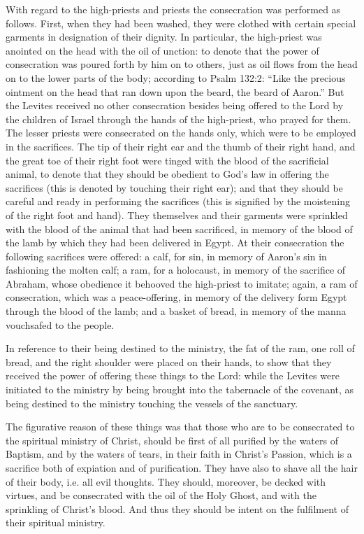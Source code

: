 With regard to the high-priests and priests the consecration was performed as follows. First, when they had been washed, they were clothed with certain special garments in designation of their dignity. In particular, the high-priest was anointed on the head with the oil of unction: to denote that the power of consecration was poured forth by him on to others, just as oil flows from the head on to the lower parts of the body; according to Psalm 132:2: ``Like the precious ointment on the head that ran down upon the beard, the beard of Aaron.'' But the Levites received no other consecration besides being offered to the Lord by the children of Israel through the hands of the high-priest, who prayed for them. The lesser priests were consecrated on the hands only, which were to be employed in the sacrifices. The tip of their right ear and the thumb of their right hand, and the great toe of their right foot were tinged with the blood of the sacrificial animal, to denote that they should be obedient to God's law in offering the sacrifices (this is denoted by touching their right ear); and that they should be careful and ready in performing the sacrifices (this is signified by the moistening of the right foot and hand). They themselves and their garments were sprinkled with the blood of the animal that had been sacrificed, in memory of the blood of the lamb by which they had been delivered in Egypt. At their consecration the following sacrifices were offered: a calf, for sin, in memory of Aaron's sin in fashioning the molten calf; a ram, for a holocaust, in memory of the sacrifice of Abraham, whose obedience it behooved the high-priest to imitate; again, a ram of consecration, which was a peace-offering, in memory of the delivery form Egypt through the blood of the lamb; and a basket of bread, in memory of the manna vouchsafed to the people.

In reference to their being destined to the ministry, the fat of the ram, one roll of bread, and the right shoulder were placed on their hands, to show that they received the power of offering these things to the Lord: while the Levites were initiated to the ministry by being brought into the tabernacle of the covenant, as being destined to the ministry touching the vessels of the sanctuary.

The figurative reason of these things was that those who are to be consecrated to the spiritual ministry of Christ, should be first of all purified by the waters of Baptism, and by the waters of tears, in their faith in Christ's Passion, which is a sacrifice both of expiation and of purification. They have also to shave all the hair of their body, i.e. all evil thoughts. They should, moreover, be decked with virtues, and be consecrated with the oil of the Holy Ghost, and with the sprinkling of Christ's blood. And thus they should be intent on the fulfilment of their spiritual ministry.


